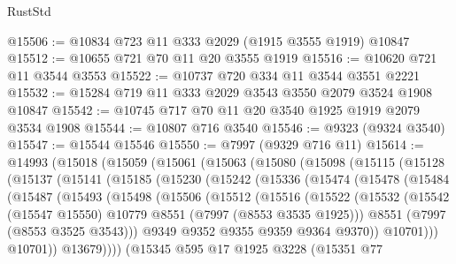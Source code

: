 \begin{lexlean}{RustStd}
\begin{coremodule}
@15506 := @10834 @723 @11 @333 @2029 (@1915 @3555 @1919) @10847
@15512 := @10655 @721 @70 @11 @20 @3555 @1919
@15516 := @10620 @721 @11 @3544 @3553
@15522 := @10737 @720 @334 @11 @3544 @3551 @2221
@15532 := @15284 @719 @11 @333 @2029 @3543 @3550 @2079 @3524 @1908 @10847
@15542 := @10745 @717 @70 @11 @20 @3540 @1925 @1919 @2079 @3534 @1908
@15544 := @10807 @716 @3540
@15546 := @9323 (@9324 @3540)
@15547 := @15544 @15546
@15550 := @7997 (@9329 @716 @11)
@15614 := @14993
    (@15018
      (@15059
        (@15061
          (@15063
            (@15080
              (@15098
                (@15115
                  (@15128
                    (@15137
                      (@15141
                        (@15185
                          (@15230
                            (@15242
                              (@15336
                                (@15474
                                  (@15478
                                    (@15484
                                      (@15487
                                        (@15493
                                          (@15498
                                            (@15506
                                              (@15512
                                                (@15516
                                                  (@15522
                                                    (@15532
                                                      (@15542
                                                        (@15547 @15550)
                                                        @10779
                                                        @8551
                                                        (@7997 (@8553 @3535 @1925)))
                                                      @8551
                                                      (@7997 (@8553 @3525 @3543)))
                                                    @9349
                                                    @9352
                                                    @9355
                                                    @9359
                                                    @9364
                                                    @9370))
                                                @10701)))
                                          @10701))
                                      @13679))))
                              (@15345
                                @595
                                @17
                                @1925
                                @3228
                                (@15351
                                  @77

\end{coremodule}
\end{lexlean}
